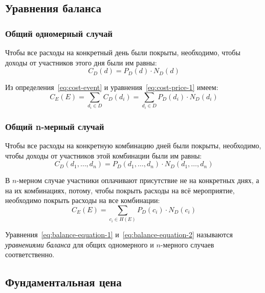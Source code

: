 \subsection{Уравнения баланса}

\subsubsection{Общий одномерный случай}

Чтобы все расходы на конкретный день были покрыты, необходимо, чтобы доходы от участников этого дня были им равны:
\begin{equation}
	C_D(d) = P_D(d) \cdot N_D(d)
	\label{eq:cost-price-1}
\end{equation}

Из определения~\ref{eq:cost-event} и уравнения~\ref{eq:cost-price-1} имеем:
\begin{equation}
	C_E(E) = \sum_{d_i \in D} C_D(d_i) = \sum_{d_i \in D}{P_D(d_i) \cdot N_D(d_i)}
	\label{eq:balance-equation-1}
\end{equation}

\subsubsection{Общий n-мерный случай}

Чтобы все расходы на конкретную комбинацию дней были покрыты, необходимо, чтобы доходы от участников этой комбинации были им равны:
\begin{equation}
	C_D(d_1, \dots, d_n) = P_D(d_1, \dots, d_n) \cdot N_D(d_1, \dots, d_n)
	\label{eq:cost-price-2}
\end{equation}

В $n$-мерном случае участники оплачивают присутствие не на конкретных днях, а на их комбинациях, потому, чтобы покрыть расходы на всё мероприятие, необходимо покрыть расходы на все комбинации:
\begin{equation}
	C_E(E) = \sum_{c_i \in H(E)}{P_D(c_i) \cdot N_D(c_i)}
	\label{eq:balance-equation-2}
\end{equation}

Уравнения~\ref{eq:balance-equation-1} и~\ref{eq:balance-equation-2} называются \textit{уравнениями баланса} для общих одномерного и $n$-мерного случаев соответственно.

\subsection{Фундаментальная цена}

